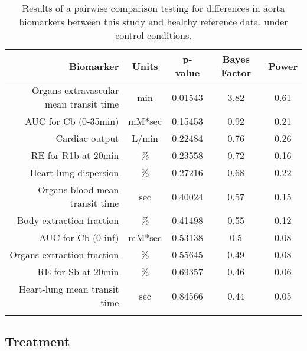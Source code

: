 \documentclass{epflreport}%
\begin{document}
\begin{longtable}{rcccc}%
\hline%
Biomarker&Units&p{-}value&Bayes Factor&Power\\%
\hline%
Organs extravascular mean transit time&min&0.01543&3.82&0.61\\%
AUC for Cb (0{-}35min)&mM*sec&0.15453&0.92&0.21\\%
Cardiac output&L/min&0.22484&0.76&0.26\\%
RE for R1b at 20min&\%&0.23558&0.72&0.16\\%
Heart{-}lung dispersion&\%&0.27216&0.68&0.22\\%
Organs blood mean transit time&sec&0.40024&0.57&0.15\\%
Body extraction fraction&\%&0.41498&0.55&0.12\\%
AUC for Cb (0{-}inf)&mM*sec&0.53138&0.5&0.08\\%
Organs extraction fraction&\%&0.55645&0.49&0.08\\%
RE for Sb at 20min&\%&0.69357&0.46&0.06\\%
Heart{-}lung mean transit time&sec&0.84566&0.44&0.05\\%
\hline%
\caption{Results of a pairwise comparison testing for differences in aorta biomarkers between this study and healthy reference data, under control conditions.} \\%
\end{longtable}%
\clearpage%
\subsection{Treatment}%
\label{subsec:Treatment}%
\end{document}
